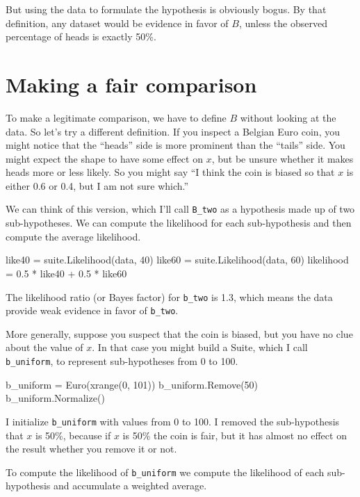 \documentclass[12pt]{book}
\theoremstyle{exercise}
\begin{document}
But using the data to formulate the hypothesis
is obviously bogus.  By that definition, any dataset would
be evidence in favor of $B$, unless the observed percentage of heads
is exactly 50\%.

\section{Making a fair comparison}
\label{suitelike}

To make a legitimate comparison, we have to define $B$ without looking
at the data.  So let's try a different definition.  If you inspect
a Belgian Euro coin, you might notice that the ``heads'' side is more
prominent than the ``tails'' side.  You might expect the shape to 
have some effect on
$x$, but be unsure whether it makes heads more or less
likely.  So you might say ``I think the coin is biased so that
$x$ is either 0.6 or 0.4, but I am not sure which.''

We can think of this version, which I'll call \verb"B_two"
as a hypothesis made up of two
sub-hypotheses.  We can compute the likelihood for each
sub-hypothesis and then compute the average likelihood.

\begin{code}
    like40 = suite.Likelihood(data, 40)
    like60 = suite.Likelihood(data, 60)
    likelihood = 0.5 * like40 + 0.5 * like60
\end{code}

The likelihood ratio (or Bayes factor) for \verb"b_two" is 1.3, which
means the data provide weak evidence in favor of \verb"b_two".

More generally, suppose you suspect that the coin is biased, but you
have no clue about the value of $x$.  In that case you might build a
Suite, which I call \verb"b_uniform", to represent sub-hypotheses from
0 to 100.

\begin{code}
    b_uniform = Euro(xrange(0, 101))
    b_uniform.Remove(50)
    b_uniform.Normalize()
\end{code}

I initialize \verb"b_uniform" with values from 0 to 100.
I removed the sub-hypothesis that $x$ is 50\%, because if
$x$ is 50\% the coin is fair, but it has almost no
effect on the result whether you remove it or not.

To compute the likelihood of
\verb"b_uniform" we compute the likelihood of each sub-hypothesis
and accumulate a weighted average.
\end{document}
